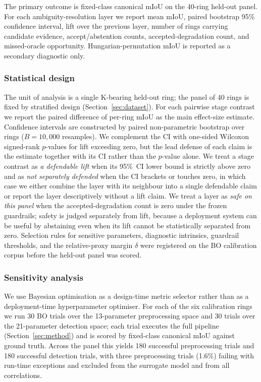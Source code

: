 \documentclass[a4paper,fleqn]{cas-dc}
\begin{document}
The primary outcome is fixed-class canonical mIoU on the 40-ring held-out panel. For each ambiguity-resolution layer we report mean mIoU, paired bootstrap 95\% confidence interval, lift over the previous layer, number of rings carrying candidate evidence, accept/abstention counts, accepted-degradation count, and missed-oracle opportunity. Hungarian-permutation mIoU is reported as a secondary diagnostic only.

\subsubsection{Statistical design}\label{sec:stat-design}

The unit of analysis is a single K-bearing held-out ring; the panel of 40 rings is fixed by stratified design (Section~\ref{sec:dataset}). For each pairwise stage contrast we report the paired difference of per-ring mIoU as the main effect-size estimate. Confidence intervals are constructed by paired non-parametric bootstrap over rings ($B=10{,}000$ resamples). We complement the CI with one-sided Wilcoxon signed-rank $p$-values for lift exceeding zero, but the lead defense of each claim is the estimate together with its CI rather than the $p$-value alone. We treat a stage contrast as \emph{a defendable lift} when its 95\%~CI lower bound is strictly above zero and as \emph{not separately defended} when the CI brackets or touches zero, in which case we either combine the layer with its neighbour into a single defendable claim or report the layer descriptively without a lift claim. We treat a layer as \emph{safe on this panel} when the accepted-degradation count is zero under the frozen guardrails; safety is judged separately from lift, because a deployment system can be useful by abstaining even when its lift cannot be statistically separated from zero. Selection rules for sensitive parameters, diagnostic intrinsics, guardrail thresholds, and the relative-proxy margin $\delta$ were registered on the BO calibration corpus before the held-out panel was scored.

\subsubsection{Sensitivity analysis}\label{sec:sensitivity-method}

We use Bayesian optimisation as a design-time metric selector rather than as a deployment-time hyperparameter optimiser. For each of the six calibration rings we run 30 BO trials over the 13-parameter preprocessing space and 30 trials over the 21-parameter detection space; each trial executes the full pipeline (Section~\ref{sec:method}) and is scored by fixed-class canonical mIoU against ground truth. Across the panel this yields 180 successful preprocessing trials and 180 successful detection trials, with three preprocessing trials (1.6\%) failing with run-time exceptions and excluded from the surrogate model and from all correlations.
\end{document}
